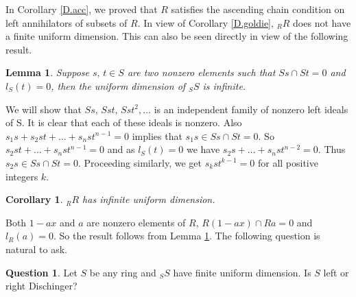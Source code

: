 \documentclass[12pt]{article}
\makeatletter
\theoremstyle{plain}
\newtheorem{lemma}[thm]{Lemma}
\newtheorem{cor}[thm]{Corollary}
\theoremstyle{definition}
\newtheorem{question}[thm]{Question}
\renewenvironment{proof}[1][\proofname]{%
	\par\pushQED{\qed}%
	\normalfont %
	\topsep6\p@\@plus6\p@\relax
	\trivlist
	\item[\hskip\labelsep\bfseries #1\@addpunct{.}]%
}{%
	\popQED\endtrivlist\@endpefalse
}
\renewcommand{\proofname}{Proof}
\makeatother
\begin{document}
	
	\vspace{3mm}
	In Corollary \ref{D.acc}, we proved that $R$ satisfies the ascending chain condition on left annihilators of subsets of $R$. In view of Corollary \ref{D.goldie}, $_RR$ does not have a finite uniform dimension. This can also be seen directly in view of the following result.
	\begin{lemma}\label{D.uniform}
		Suppose $s,\,t \in S$ are two nonzero elements such that $Ss \cap St = 0$ and $l_S(t) = 0$, then the uniform dimension of $_SS$ is infinite.
	\end{lemma}
	\begin{proof}
		We will show that $Ss,\,Sst,\,Sst^2, \ldots$ is an independent family of nonzero left ideals of S. It is clear that each of these ideals is nonzero. Also $s_1s+s_2st+\ldots+s_nst^{n-1} = 0$ implies that $s_1s \in Ss \cap St = 0$. So $s_2st+\ldots+s_nst^{n-1} = 0$ and as $l_S(t) = 0$ we have $s_2s+\ldots+s_nst^{n-2} = 0$. Thus $s_2s \in Ss \cap St = 0$. Proceeding similarly, we get $s_kst^{k-1} = 0$ for all positive integers $k$. 
	\end{proof}
	\begin{cor}
		$_RR$ has infinite uniform dimension.
	\end{cor}
	\begin{proof}
		Both $1-ax$ and $a$ are nonzero elements of $R$, $R(1-ax) \cap Ra = 0$ and $l_R(a) = 0$. So the result follows from Lemma \ref{D.uniform}. 
	\end{proof}
	The following question is natural to ask.
	\begin{question}
		Let $S$ be any ring and $_SS$ have finite uniform dimension. Is $S$ left or right Dischinger?
	\end{question}
\end{document}
